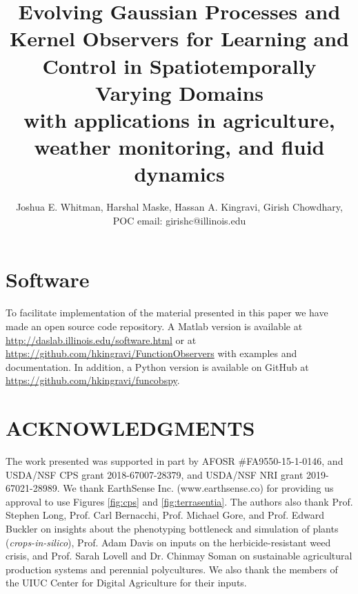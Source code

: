 \documentclass[letterpaper,12pt,peerreviewca,draftcls]{IEEEtran}
\title{Evolving Gaussian Processes and Kernel Observers for Learning and Control in Spatiotemporally Varying Domains\\\Large with applications in agriculture, weather monitoring, and fluid dynamics}
\author{Joshua E. Whitman, Harshal Maske, Hassan A. Kingravi, Girish Chowdhary, \\ POC email: girishc@illinois.edu}
\newcommand{\XX}[1]{{\bf XX #1 XX}}
\begin{document}
\maketitle
\CSMsetup
\linenumbers \modulolinenumbers[5] %








\section{Software}
To facilitate implementation of the material presented in this paper we have made an open source code repository. A Matlab version is available at \url{http://daslab.illinois.edu/software.html} or at \url{https://github.com/hkingravi/FunctionObservers} with examples and documentation. In addition, a Python version is available on GitHub at \url{https://github.com/hkingravi/funcobspy}.

\section{ACKNOWLEDGMENTS}
The work presented was supported in part by AFOSR \#FA9550-15-1-0146, %
and USDA/NSF CPS grant 2018-67007-28379, and USDA/NSF NRI grant 2019-67021-28989.  We thank EarthSense Inc. (www.earthsense.co) for providing us approval to use Figures \ref{fig:cps} and \ref{fig:terrasentia}. The authors also thank Prof. Stephen Long, Prof. Carl Bernacchi, Prof. Michael Gore, and Prof. Edward Buckler on insights about the phenotyping bottleneck and simulation of plants (\textit{crops-in-silico}), Prof. Adam Davis on inputs on the herbicide-resistant weed crisis, and Prof. Sarah Lovell and Dr. Chinmay Soman on sustainable agricultural production systems and perennial polycultures. We also thank the members of the UIUC Center for Digital Agriculture for their inputs.

%


\clearpage


\end{document}

